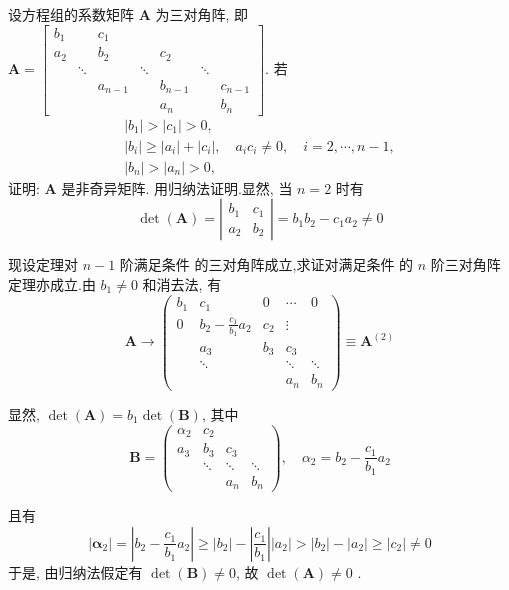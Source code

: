 \begin{tcolorbox}[enhanced,colback=10,colframe=9,breakable,coltitle=green!25!black,title=2024]
  
设方程组的系数矩阵 $ \boldsymbol{A} $ 为三对角阵, 即
$
\boldsymbol{A}=\left[\begin{array}{ccccccc}
b_{1} & & c_{1} & & & & \\
a_{2} & & b_{2} & & c_{2} & & \\
& \ddots & & \ddots & & \ddots & \\
& & a_{n-1} & & b_{n-1} & & c_{n-1} \\
& & & & a_{n} & & b_{n}
\end{array}\right] .
$
若
$$
\begin{array}{l}
\left|b_{1}\right|>\left|c_{1}\right|>0, \\
\left|b_{i}\right| \geqslant\left|a_{i}\right|+\left|c_{i}\right|, \quad a_{i} c_{i} \neq 0, \quad i=2, \cdots, n-1, \\
\left|b_{n}\right|>\left|a_{n}\right|>0,
\end{array}
$$
证明: $ \boldsymbol{A} $ 是非奇异矩阵.
\tcblower
用归纳法证明.显然, 当 $ n=2 $ 时有
$$
\operatorname{det}(\boldsymbol{A})=\left|\begin{array}{ll}
b_{1} & c_{1} \\
a_{2} & b_{2}
\end{array}\right|=b_{1} b_{2}-c_{1} a_{2} \neq 0
$$

现设定理对 $ n-1 $ 阶满足条件 的三对角阵成立,求证对满足条件 的 $ n $ 阶三对角阵定理亦成立.由 $ b_{1} \neq 0 $ 和消去法, 有
$$
\boldsymbol{A} \rightarrow\left(\begin{array}{ccccc}
b_{1} & c_{1} & 0 & \cdots & 0 \\
0 & b_{2}-\frac{c_{1}}{b_{1}} a_{2} & c_{2} & \vdots & \\
& a_{3} & b_{3} & c_{3} & \\
& \ddots & & \ddots & \ddots \\
& & & a_{n} & b_{n}
\end{array}\right) \equiv \boldsymbol{A}^{(2)}
$$

显然, $ \operatorname{det}(\boldsymbol{A})=b_{1} \operatorname{det}(\boldsymbol{B}) $, 其中
$$
\boldsymbol{B}=\left(\begin{array}{cccc}
\alpha_{2} & c_{2} & & \\
a_{3} & b_{3} & c_{3} & \\
& \ddots & \ddots & \ddots \\
& & a_{n} & b_{n}
\end{array}\right), \quad \alpha_{2}=b_{2}-\frac{c_{1}}{b_{1}} a_{2}
$$

且有
$$
\left|\boldsymbol{\alpha}_{2}\right|=\left|b_{2}-\frac{c_{1}}{b_{1}} a_{2}\right| \geqslant\left|b_{2}\right|-\left|\frac{c_{1}}{b_{1}}\right|\left|a_{2}\right|>\left|b_{2}\right|-\left|a_{2}\right| \geqslant\left|c_{2}\right| \neq 0
$$
于是, 由归纳法假定有 $ \operatorname{det}(\boldsymbol{B}) \neq 0 $, 故 $ \operatorname{det}(\boldsymbol{A}) \neq 0 $ .

\end{tcolorbox}


